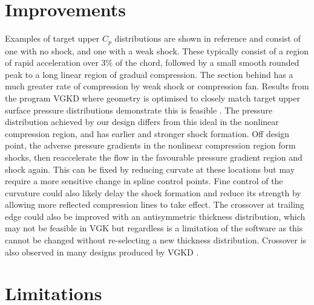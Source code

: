 \documentclass{article}
\begin{document}
\section{Improvements}
Examples of target upper $C_p$ distributions are shown in reference \cite{esdu} and consist of one with no shock, and one with a weak shock.
These typically consist of a region of rapid acceleration over 3\% of the chord, followed by a small smooth rounded peak to a long linear region of gradual compression.
The section behind has a much greater rate of compression by weak shock or compression fan.
Results from the program VGKD where geometry is optimised to closely match target upper surface pressure distributions demonstrate this is feasible \cite{esdu}.
The pressure distribution achieved by our design differs from this ideal in the nonlinear compression region, and has earlier and stronger shock formation.
Off design point, the adverse pressure gradients in the nonlinear compression region form shocks, then reaccelerate the flow in the favourable pressure gradient region and shock again.
This can be fixed by reducing curvate at these locations but may require a more sensitive change in spline control points.
Fine control of the curvature could also likely delay the shock formation and reduce its strength by allowing more reflected compression lines to take effect.
The crossover at trailing edge could also be improved with an antisymmetric thickness distribution, which may not be feasible in VGK
but regardless is a limitation of the software as this cannot be changed without re-selecting a new thickness distribution.
Crossover is also observed in many designs produced by VGKD \cite{esdu}.

\section{Limitations}
\end{document}
